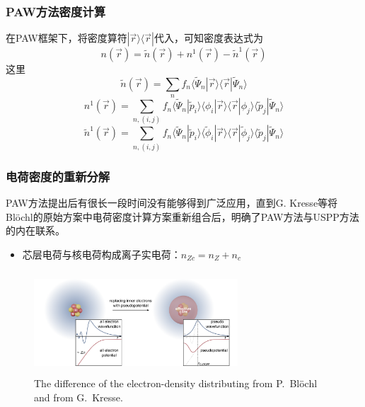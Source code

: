 \frame
{
\frametitle{\textrm{PAW}方法密度计算}
在\textrm{PAW}框架下，将密度算符$|\vec r\rangle\langle\vec r|$代入，可知密度表达式为
$$n(\vec r)=\tilde n(\vec r)+n^1(\vec r)-\tilde n^1(\vec r)$$
这里
$$\tilde n(\vec r)=\sum_nf_n\langle\tilde\Psi_n|\vec r\rangle\langle\vec r|\tilde\Psi_n\rangle$$ 
$$n^1(\vec r)=\sum_{n,(i,j)}f_n\langle\tilde\Psi_n|\tilde p_i\rangle\langle\phi_i|\vec r\rangle\langle\vec r|\phi_j\rangle\langle\tilde p_j|\tilde\Psi_n\rangle$$
$$\tilde n^1(\vec r)=\sum_{n,(i,j)}f_n\langle\tilde\Psi_n|\tilde p_i\rangle\langle\tilde\phi_i|\vec r\rangle\langle\vec r|\tilde\phi_j\rangle\langle\tilde p_j|\tilde\Psi_n\rangle$$
}


\frame
{
\frametitle{电荷密度的重新分解}
\textrm{PAW}方法提出后有很长一段时间没有能够得到广泛应用，直到\textrm{G. Kresse}等将\textrm{Bl\"ochl}的原始方案中电荷密度计算方案重新组合后，明确了\textrm{PAW}方法与\textrm{USPP}方法的内在联系。
\begin{itemize}
	\item 芯层电荷与核电荷构成离子实电荷：$n_{Zc}=n_Z+n_c$
\end{itemize}
\begin{figure}[h!]
\centering
\vspace{-10.5pt}
\includegraphics[height=1.5in,width=3.0in,viewport=0 0 380 190,clip]{Figures/Pseudo-potential_charge.png}
\caption{\tiny \textrm{The difference of the electron-density distributing from P.~Bl\"ochl  and from G.~Kresse.}}%
\label{PAW_Pseudo-Charge}
\end{figure}
}

